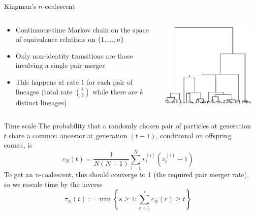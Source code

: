 \documentclass[aspectratio=169]{beamer}
\theoremstyle{definition}
\newcommand{\vt}[2][t]{v_{#1}^{(#2)}}
\begin{document}
\begin{frame}{Kingman's $n$-coalescent}
\begin{columns}
\begin{column}{0.45\textwidth}
\begin{itemize}
\item Continuous-time Markov chain on the space of equivalence relations on $\{1,\dots,n\}$
\item Only non-identity transitions are those involving a single pair merger
\item This happens at rate 1 for each pair of lineages (total rate $\binom{k}{2}$ while there are $k$ distinct lineages)
\end{itemize}
\end{column}
\begin{column}{0.45\textwidth}
\includegraphics[width=\textwidth]{kingman.png}
\end{column}
\end{columns}
\end{frame}


\begin{frame}{Time scale}
The probability that a randomly chosen pair of particles at generation $t$ share a common ancestor at generation $(t-1)$, conditional on offspring counts, is
\begin{equation*}
c_N(t) = \frac{1}{N(N-1)} \sum_{i=1}^N \vt{i}(\vt{i}-1)
\end{equation*}
To get an $n$-coalescent, this should converge to 1 (the required pair merger rate),
so we rescale time by the inverse
\begin{equation*}
\tau_N(t) := \min\left\{ s\geq 1 : \sum_{r=1}^s c_N(r) \geq t \right\}
\end{equation*}

\end{frame}
\end{document}
